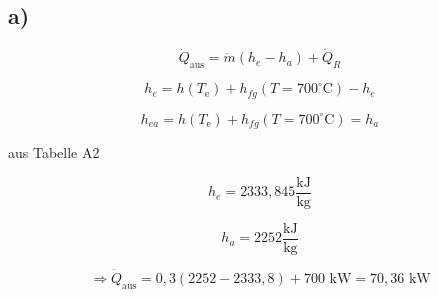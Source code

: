 

\subsection*{a)}

\[
\dot{Q}_{\text{aus}} = \dot{m} (h_e - h_a) + \dot{Q}_R
\]

\[
h_e = h \left( T_{\text{e}} \right) + h_{fg} \left( T = 700^\circ \text{C} \right) - h_e
\]

\[
h_{ea} = h \left( T_{\text{e}} \right) + h_{fg} \left( T = 700^\circ \text{C} \right) = h_a
\]

aus Tabelle A2

\[
h_e = 2333,845 \frac{\text{kJ}}{\text{kg}}
\]

\[
h_a = 2252 \frac{\text{kJ}}{\text{kg}}
\]

\[
\Rightarrow \dot{Q}_{\text{aus}} = 0,3 \left( 2252 - 2333,8 \right) + 700 \text{ kW} = 70,36 \text{ kW}
\]
